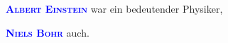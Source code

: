 \documentclass[12pt,ngerman]{scrartcl}
\newcommand{\person}[1]{\textcolor{red}{\textsc{\bfseries #1}}}
\renewcommand{\person}[1]{\textcolor{blue}{\textsc{\bfseries #1}}}
\begin{document}
\person{Albert Einstein} war ein bedeutender Physiker,

\person{Niels Bohr} auch.
\end{document}
